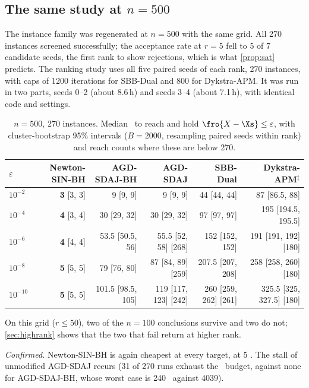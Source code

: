 

\subsection{The same study at $n=500$}\label{sec:n500}
The instance family was regenerated at $n=500$ with the same grid. All 270
instances screened successfully; the acceptance rate at $r=5$ fell to 5 of 7
candidate seeds, the first rank to show rejections, which is what
\cref{prop:sat} predicts. The ranking study uses all five paired seeds of
each rank, 270 instances, with caps of 1200 iterations for SBB-Dual and 800
for Dykstra-APM. It was run in two parts, seeds 0--2 (about 8.6\,h) and seeds
3--4 (about 7.1\,h), with identical code and settings.

\begin{table}[t]
\centering
\caption{$n=500$, 270 instances. Median \EVDs\ to reach and hold
$\fro{X-\Xs}\le\varepsilon$, with cluster-bootstrap 95\% intervals
($B=2000$, resampling paired seeds within rank) and reach counts where these
are below 270.}
\label{tab:n500}
\small
\begin{tabular}{lrrrrr}
\toprule
$\varepsilon$ & Newton-SIN-BH & AGD-SDAJ-BH & AGD-SDAJ & SBB-Dual & Dykstra-APM$^{\ddagger}$\\
\midrule
$10^{-2}$  & \textbf{3} [3, 3] & 9 [9, 9] & 9 [9, 9] & 44 [44, 44] & 87 [86.5, 88]\\
$10^{-4}$  & \textbf{4} [3, 4] & 30 [29, 32] & 30 [29, 32] & 97 [97, 97] & 195 [194.5, 195.5]\\
$10^{-6}$  & \textbf{4} [4, 4] & 53.5 [50.5, 56] & 55.5 [52, 58] \tiny[268] & 152 [152, 152] & 191 [191, 192] \tiny[180]\\
$10^{-8}$  & \textbf{5} [5, 5] & 79 [76, 80] & 87 [84, 89] \tiny[259] & 207.5 [207, 208] & 258 [258, 260] \tiny[180]\\
$10^{-10}$ & \textbf{5} [5, 5] & 101.5 [98.5, 105] & 119 [117, 123] \tiny[242] & 260 [259, 262] \tiny[261] & 325.5 [325, 327.5] \tiny[180]\\
\bottomrule
\end{tabular}
\end{table}

On this grid ($r\le50$), two of the $n=100$ conclusions survive and two do
not; \cref{sec:highrank} shows that the two that fail return at higher rank.

\emph{Confirmed.} Newton-SIN-BH is again cheapest at every target, at 5 \EVDs.
The stall of unmodified AGD-SDAJ recurs (31 of 270 runs exhaust the \EVD\
budget, against none for AGD-SDAJ-BH, whose worst case is 240 \EVDs\ against
4039).

